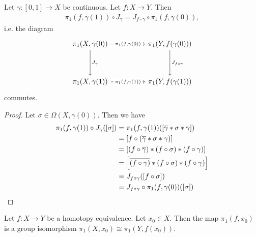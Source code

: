 \begin{lemma}
	Let $\gamma : [0,1] \to X$ be continuous. Let $f : X \to Y$. Then
	\begin{align*}
		\pi_{1}(f, \gamma(1)) \circ J_\gamma = J_{f \circ \gamma} \circ \pi_{1}(f, \gamma(0)),
	\end{align*}
	i.e. the diagram
	\[\begin{tikzcd}
		{\pi_1(X, \gamma(0))} && {\pi_1(Y, f(\gamma(0)))} \\
		\\
		{\pi_1(X, \gamma(1))} && {\pi_1(Y, f(\gamma(1)))}
		\arrow["{\pi_{1}(f, \gamma(0))}"{description}, from=1-1, to=1-3]
		\arrow["{J_\gamma}", from=1-1, to=3-1]
		\arrow["{J_{f \circ \gamma}}", from=1-3, to=3-3]
		\arrow["{\pi_{1}(f, \gamma(1))}"{description}, from=3-1, to=3-3]
	\end{tikzcd}\]
	commutes.
\end{lemma}
\begin{proof}
	Let $\sigma \in \Omega(X, \gamma(0))$. Then we have
	\begin{align*}
		\pi_{1}(f, \gamma(1)) \circ J_\gamma([\sigma])
		&=
		\pi_{1}(f, \gamma(1))(\qty[\overline{{\gamma}} * \sigma * \gamma])\\
		&=
		\qty[f \circ (\overline{{\gamma}} * \sigma * \gamma)]\\
		&=
		\qty[(f \circ \overline{{\gamma}}) * (f \circ \sigma) * (f \circ \gamma)]\\
		&=
		\qty[\overline{{(f \circ \gamma)}} * (f \circ \sigma) * (f \circ \gamma)]\\
		&=
		J_{f \circ \gamma}([f \circ \sigma])\\
		&=
		J_{f \circ \gamma} \circ \pi_{1}(f, \gamma(0))([\sigma])
	\end{align*}
\end{proof}
\begin{theorem}
	Let $f : X \to Y$ be a homotopy equivalence. Let $x_0 \in X$. Then the map $\pi_{1}(f, x_0)$ is a group isomorphism $\pi_1(X, x_0) \cong \pi_1(Y, f(x_0))$.
\end{theorem}
